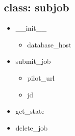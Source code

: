 \documentclass[]{article}
\begin{document}
\subsection{class: subjob}
\begin{itemize}
\item \_\_init\_\_
		\begin{itemize}
			\item database\_host
		\end{itemize}
	\item submit\_job
	\begin{itemize}
		\item pilot\_url
		\item jd
	\end{itemize}

	\item get\_state

	\item delete\_job
\end{itemize}



\end{document}
